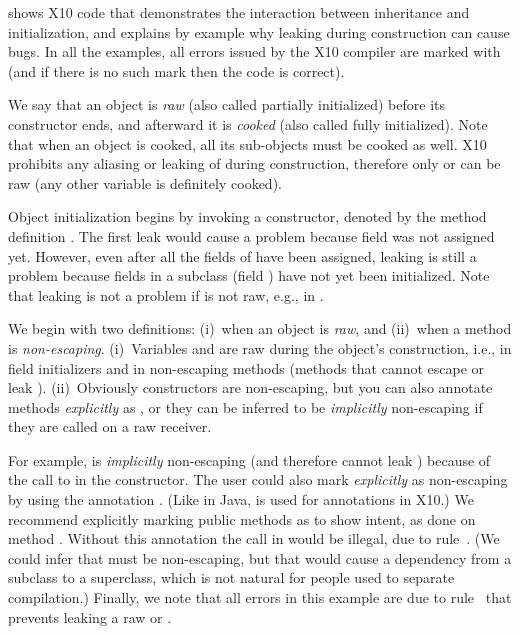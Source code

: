  shows X10 code that demonstrates the interaction
    between inheritance and initialization,
    and explains by example why leaking \this during construction can cause bugs.
In all the examples, all errors issued by the X10 compiler are marked with 
    (and if there is no such mark then the code is correct).

We say that an object is \emph{raw} (also called partially initialized) before its constructor ends,
    and afterward it is \emph{cooked} (also called fully initialized).
Note that when an object is cooked, all its sub-objects must be cooked as well.
X10 prohibits any aliasing or leaking of \this during construction,
    therefore only \this or  can be raw (any other variable is definitely cooked).

Object initialization begins by invoking a constructor,
    denoted by the method definition .
The first leak would cause a problem because field  was not assigned yet.
However, even after all the fields of  have been assigned,
    leaking is still a problem
    because fields in a subclass (field ) have not yet been initialized.
Note that leaking is not a problem if \this is not raw, e.g., in .

We begin with two definitions:
    (i)~when an object is \emph{raw}, and
    (ii)~when a method is \emph{non-escaping}.
(i)~Variables \this and  are raw
    during the object's construction,
    i.e., in field initializers and in {non-escaping} methods
    (methods that cannot escape or leak \this).
(ii)~Obviously constructors are non-escaping,
    but you can also annotate methods \emph{explicitly} as ,
    or they can be inferred to be \emph{implicitly} non-escaping
    if they are called on a raw \this receiver.

For example,  is \emph{implicitly} non-escaping (and therefore cannot leak \this)
    because of the call to 
    in the constructor.
The user could also mark  \emph{explicitly} as non-escaping by using the annotation
    .
(Like in Java,  is used for annotations in X10.)
We recommend explicitly marking public methods as  to show intent,
    as done on method .
Without this annotation the call  in  would be illegal,
    due to rule~.
(We could infer that  must be non-escaping,
    but that would cause a dependency from a subclass to a superclass,
    which is not natural for people used to separate compilation.)
Finally, we note that all errors in this example are due to rule~
    that prevents leaking a raw \this or .




